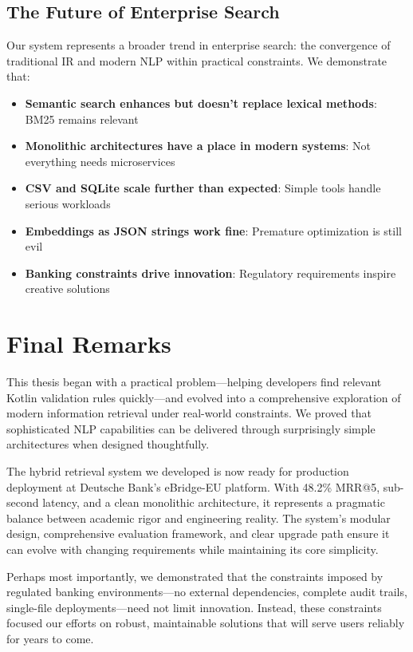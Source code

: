 \subsection{The Future of Enterprise Search}

Our system represents a broader trend in enterprise search: the convergence of traditional IR and modern NLP within practical constraints. We demonstrate that:

\begin{itemize}[leftmargin=*,itemsep=2pt,topsep=2pt]
 \item \textbf{Semantic search enhances but doesn't replace lexical methods}: BM25 remains relevant
 \item \textbf{Monolithic architectures have a place in modern systems}: Not everything needs microservices
 \item \textbf{CSV and SQLite scale further than expected}: Simple tools handle serious workloads
 \item \textbf{Embeddings as JSON strings work fine}: Premature optimization is still evil
 \item \textbf{Banking constraints drive innovation}: Regulatory requirements inspire creative solutions
\end{itemize}

\section{Final Remarks}

This thesis began with a practical problem—helping developers find relevant Kotlin validation rules quickly—and evolved into a comprehensive exploration of modern information retrieval under real-world constraints. We proved that sophisticated NLP capabilities can be delivered through surprisingly simple architectures when designed thoughtfully.

The hybrid retrieval system we developed is now ready for production deployment at Deutsche Bank's eBridge-EU platform. With 48.2\% MRR@5, sub-second latency, and a clean monolithic architecture, it represents a pragmatic balance between academic rigor and engineering reality. The system's modular design, comprehensive evaluation framework, and clear upgrade path ensure it can evolve with changing requirements while maintaining its core simplicity.

Perhaps most importantly, we demonstrated that the constraints imposed by regulated banking environments—no external dependencies, complete audit trails, single-file deployments—need not limit innovation. Instead, these constraints focused our efforts on robust, maintainable solutions that will serve users reliably for years to come.

